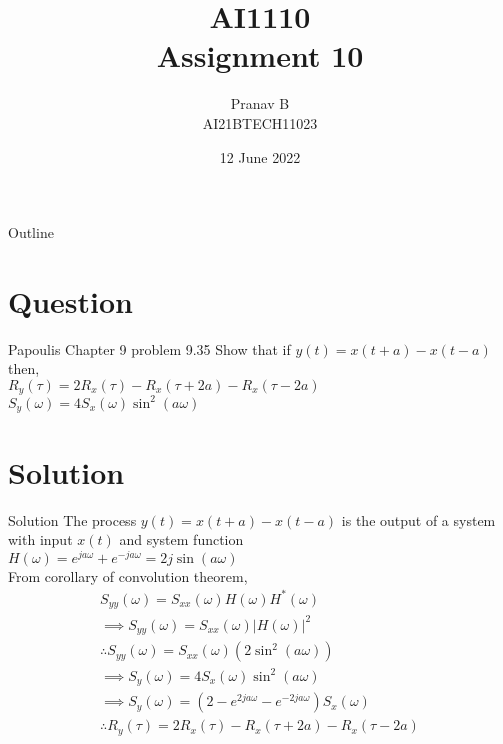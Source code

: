 \documentclass{beamer}
\title{AI1110 \\ Assignment 10}
\author{Pranav B \\ AI21BTECH11023}
\date{ 12 June 2022}
\begin{document}
	\begin{frame}
		\titlepage
	\end{frame}
	
	\begin{frame}{Outline}
    		\tableofcontents
	\end{frame}
	
	\section{Question}
	\begin{frame}{ Papoulis Chapter 9 problem 9.35}
Show that if $y(t)=x(t+a)-x(t-a)$ then,\\
$R_{y}(\tau)=2R_{x}(\tau)-R_{x}(\tau+2a)-R_{x}(\tau-2a)$\\
$S_{y}(\omega)=4S_{x}(\omega)\sin^{2}(a\omega)$
	\end{frame}
	\section{Solution}
	\begin{frame}{Solution}
	The process $y(t)=x(t+a)-x(t-a)$ is the output of a system with input $x(t)$ and system function\\
	$H(\omega)=e^{ja\omega}+e^{-ja\omega}=2j\sin(a\omega)$\\
	From corollary of convolution theorem,\\
	\begin{align}
	S_{yy}(\omega)=S_{xx}(\omega)H(\omega)H^{*}(\omega)\\
	\implies S_{yy}(\omega)=S_{xx}(\omega)|H(\omega)|^{2}\\
	\therefore S_{yy}(\omega)=S_{xx}(\omega)(2\sin^{2}(a\omega))\\
	\implies S_{y}(\omega)=4S_{x}(\omega)\sin^{2}(a\omega)\\
	\implies S_{y}(\omega)=(2-e^{2ja\omega}-e^{-2ja\omega})S_{x}(\omega)\\
	\therefore R_{y}(\tau)=2R_{x}(\tau)-R_{x}(\tau+2a)-R_{x}(\tau-2a)
	\end{align}
	\end{frame}
\end{document}
